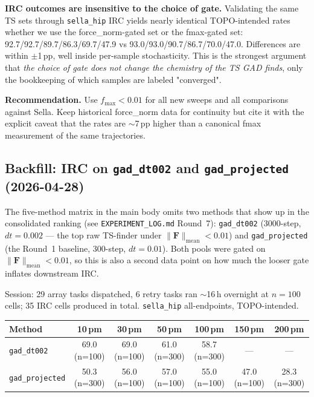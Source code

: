 \documentclass[11pt]{article}
\begin{document}
\textbf{IRC outcomes are insensitive to the choice of gate.} Validating
the same TS sets through \texttt{sella\_hip} IRC yields nearly identical
TOPO-intended rates whether we use the force\_norm-gated set or the
fmax-gated set: 92.7/92.7/89.7/86.3/69.7/47.9 vs 93.0/93.0/90.7/86.7/70.0/47.0.
Differences are within $\pm$1\,pp, well inside per-sample stochasticity.
This is the strongest argument that \emph{the choice of gate does not
change the chemistry of the TS GAD finds}, only the bookkeeping of which
samples are labeled "converged".

\textbf{Recommendation.} Use $f_{\max}{<}0.01$ for all new sweeps and
all comparisons against Sella. Keep historical force\_norm data for
continuity but cite it with the explicit caveat that the rates are
$\sim$7\,pp higher than a canonical fmax measurement of the same
trajectories.

\clearpage
\subsection{Backfill: IRC on \texttt{gad\_dt002} and \texttt{gad\_projected} (2026-04-28)}

The five-method matrix in the main body omits two methods that show up in
the consolidated ranking (see \texttt{EXPERIMENT\_LOG.md} Round~7):
\texttt{gad\_dt002} (3000-step,
$dt{=}0.002$ --- the top raw TS-finder under
$\|\mathbf{F}\|_{\text{mean}}{<}0.01$) and \texttt{gad\_projected} (the
Round~1 baseline, 300-step, $dt{=}0.01$). Both pools were gated on
$\|\mathbf{F}\|_{\text{mean}}{<}0.01$, so this is also a second data
point on how much the looser gate inflates downstream IRC.

Session: 29 array tasks dispatched, 6 retry tasks ran $\sim$16\,h
overnight at $n{=}100$ cells; 35 IRC cells produced in total.
\texttt{sella\_hip} all-endpoints, TOPO-intended.

\begin{center}
\begin{tabular}{lcccccc}
\toprule
Method & 10\,pm & 30\,pm & 50\,pm & 100\,pm & 150\,pm & 200\,pm \\
\midrule
\texttt{gad\_dt002}     & 69.0 (n=100) & 69.0 (n=100) & 61.0 (n=300) & 58.7 (n=300) & --- & --- \\
\texttt{gad\_projected} & 50.3 (n=300) & 56.0 (n=100) & 57.0 (n=100) & 55.0 (n=100) & 47.0 (n=100) & 28.3 (n=300) \\
\bottomrule
\end{tabular}
\end{center}
\end{document}
